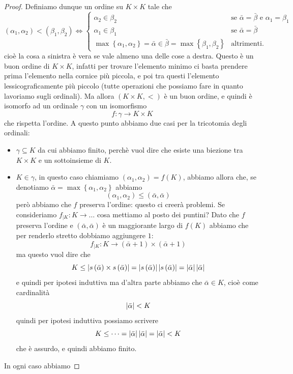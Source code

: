\documentclass[11pt]{scrartcl}
\begin{document}
\begin{proof}
 		Definiamo dunque un ordine su $K\times K$ tale che 
 		$$\left(\alpha_1,\alpha_2\right)<\left(\beta_1,\beta_2\right)\iff
 		\begin{cases}
 			\alpha_2\in \beta_2 & \text{se $\bar{\alpha}=\bar{\beta}$ e $\alpha_1= \beta_1$} \\
 			\alpha_1\in \beta_1 & \text{se $\bar{\alpha}=\bar{\beta}$} \\
 			\max\left\{\alpha_1,\alpha_2\right\}=\bar{\alpha}\in \bar{\beta}=\max\left\{\beta_1,\beta_2\right\} & \text{altrimenti.}
 		\end{cases}$$
 		cioè la cosa a sinistra è vera se vale almeno una delle cose a destra. Questo è un buon ordine di $K\times K$, infatti per trovare l'elemento minimo ci basta prendere prima l'elemento nella cornice più piccola, e poi tra questi l'elemento lessicograficamente più piccolo (tutte operazioni che possiamo fare in quanto lavoriamo sugli ordinali). Ma allora $(K\times K,<)$ è un buon ordine, e quindi è isomorfo ad un ordinale $\gamma$ con un isomorfismo
 		$$f:\gamma \to K\times K$$
 		che rispetta l'ordine. A questo punto abbiamo due casi per la tricotomia degli ordinali:
 		\begin{itemize}
 			\item $\gamma\subseteq K$ da cui abbiamo finito, perchè vuol dire che esiste una biezione tra $K\times K$ e un sottoinsieme di $K$.
 			\item $K\in \gamma$, in questo caso chiamiamo $(\alpha_1,\alpha_2)=f(K)$, abbiamo allora che, se denotiamo $\bar{\alpha}=\max\left\{\alpha_1,\alpha_2\right\}$ abbiamo
 			$$(\alpha_1,\alpha_2)\le \left(\bar{\alpha},\bar{\alpha}\right)$$
 			però abbiamo che $f$ preserva l'ordine: questo ci creerà problemi. Se consideriamo $f_{|K}:K\to \dots$ cosa mettiamo al posto dei puntini? Dato che $f$ preserva l'ordine e $(\bar{\alpha},\bar{\alpha})$ è un maggiorante largo di $f(K)$ abbiamo che per renderlo stretto dobbiamo aggiungere $1$:
 			$$f_{|K}:K\to \left(\bar{\alpha}+1\right)\times\left(\bar{\alpha}+1\right)$$
 			ma questo vuol dire che
 			$$K\le \left\lvert s\left(\bar{\alpha}\right)\times s\left(\bar{\alpha}\right) \right\rvert=\left\lvert s\left(\bar{\alpha}\right) \right\rvert\left\lvert s\left(\bar{\alpha}\right) \right\rvert=\left\lvert \bar{\alpha} \right\rvert\left\lvert \bar{\alpha} \right\rvert$$
 			e quindi per ipotesi induttiva
 			ma d'altra parte abbiamo che $\bar{\alpha}\in K$, cioè come cardinalità
 			$$\left\lvert \bar{\alpha} \right\rvert<K$$
 			quindi per ipotesi induttiva possiamo scrivere
 			$$K\le \dots =\left\lvert \bar{\alpha} \right\rvert\left\lvert \bar{\alpha} \right\rvert=\left\lvert \bar{\alpha} \right\rvert<K$$
 			che è assurdo, e quindi abbiamo finito.
 		\end{itemize}
 		In ogni caso abbiamo 
 	\end{proof}
\end{document}
